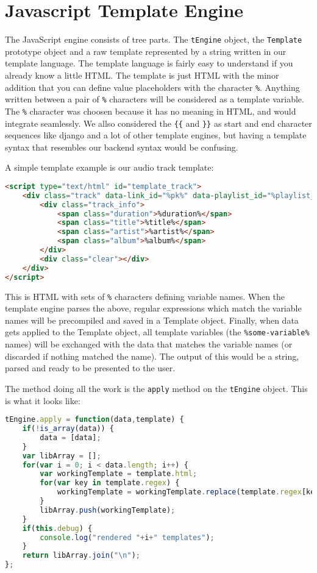 \section{Javascript Template Engine}

The JavaScript engine consists of tree parts. The 
\lstinline$tEngine$ object, the \lstinline$Template$ prototype object 
and a raw template represented by a string written in our template language. 
The template language is fairly easy to understand if you already know a little HTML. 
The template is just HTML with the minor addition that you can define value placeholders with the character \verb$%$. 
Anything written between a pair of \verb$%$ characters will be considered as a template variable. 
The \verb$%$ character was choosen because it has no meaning in HTML, and would integrate seamlessly. 
We allso considered the \verb${{$ and \verb$}}$ as start and end character 
sequences like django and a lot of other template engines, 
but having a template syntax that resembles our backend syntax would be confusing.

A simple template example is our audio track template:

\begin{lstlisting}[language=HTML,caption=The template used to represent audio tracks]
<script type="text/html" id="template_track">
	<div class="track" data-link_id="%pk%" data-playlist_id="%playlist_id%" data-path="%path%">
		<div class="track_info">
			<span class="duration">%duration%</span>
			<span class="title">%title%</span>
			<span class="artist">%artist%</span>
			<span class="album">%album%</span>
		</div>
		<div class="clear"></div>
	</div>
</script>
\end{lstlisting}

This is HTML with sets of \verb$%$ characters defining variable names. 
When the template engine parses the above, regular expressions which match the variable names will be precompiled and saved in a Template object. 
Finally, when data gets applied to the Template object, 
all template variables (the \verb$%some-variable%$ names) will be exchanged with 
the data that matches the variable names (or discarded if nothing matched the name).
The output of this would be a string, parsed and ready to be presented to the user.

The method doing all the work is the \verb$apply$ method on the \verb$tEngine$ object. This is what it looks like:
\begin{lstlisting}[language=JavaScript,caption=The javascript engine apply method]
tEngine.apply = function(data,template) {
    if(!is_array(data)) {
        data = [data];
    }
    var libArray = [];
    for(var i = 0; i < data.length; i++) {
        var workingTemplate = template.html;
        for(var key in template.regex) {
            workingTemplate = workingTemplate.replace(template.regex[key],data[i][key]);
        }
        libArray.push(workingTemplate);
    }
	if(this.debug) {
		console.log("rendered "+i+" templates");
	}
    return libArray.join("\n");
};
\end{lstlisting}


